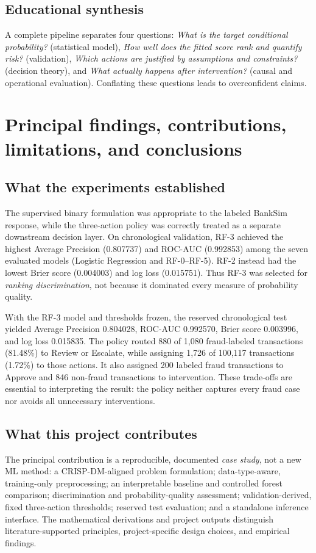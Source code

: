 \documentclass[11pt,a4paper]{article}
\begin{document}
\subsection{Educational synthesis}
A complete pipeline separates four questions: \emph{What is the target conditional probability?} (statistical model), \emph{How well does the fitted score rank and quantify risk?} (validation), \emph{Which actions are justified by assumptions and constraints?} (decision theory), and \emph{What actually happens after intervention?} (causal and operational evaluation). Conflating these questions leads to overconfident claims.


\section{Principal findings, contributions, limitations, and conclusions}
\subsection{What the experiments established}
The supervised binary formulation was appropriate to the labeled
BankSim response, while the three-action policy was correctly
treated as a separate downstream decision layer. On chronological
validation, RF-3 achieved the highest Average Precision
(0.807737) and ROC-AUC (0.992853) among the seven evaluated
models (Logistic Regression and RF-0--RF-5). RF-2 instead had
the lowest Brier score (0.004003) and log loss (0.015751).
Thus RF-3 was selected for \emph{ranking discrimination}, not
because it dominated every measure of probability quality.

With the RF-3 model and thresholds frozen, the reserved
chronological test yielded Average Precision 0.804028,
ROC-AUC 0.992570, Brier score 0.003996, and log loss
0.015835. The policy routed 880 of 1,080 fraud-labeled
transactions (81.48\%) to Review or Escalate, while assigning
1,726 of 100,117 transactions (1.72\%) to those actions.
It also assigned 200 labeled fraud transactions to Approve
and 846 non-fraud transactions to intervention. These
trade-offs are essential to interpreting the result: the
policy neither captures every fraud case nor avoids all
unnecessary interventions.

\subsection{What this project contributes}
The principal contribution is a reproducible, documented
\emph{case study}, not a new ML method: a CRISP-DM-aligned
problem formulation; data-type-aware, training-only
preprocessing; an interpretable baseline and controlled
forest comparison; discrimination and probability-quality
assessment; validation-derived, fixed three-action
thresholds; reserved test evaluation; and a standalone
inference interface. The mathematical derivations and
project outputs distinguish literature-supported principles,
project-specific design choices, and empirical findings.
\end{document}
